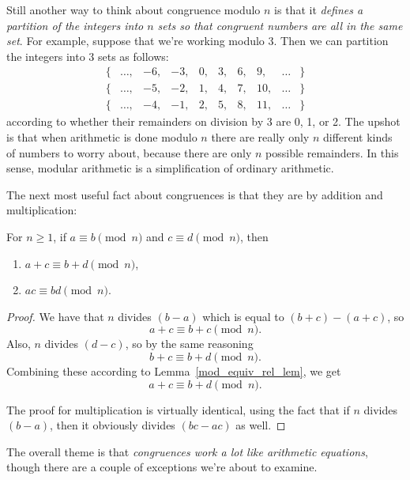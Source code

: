 Still another way to think about congruence modulo $n$ is that it \emph{defines a partition
  of the integers into $n$ sets so that congruent numbers are all in the same set}.  For
example, suppose that we're working modulo 3.  Then we can partition the integers into 3
sets as follows:
\[
\begin{array}{cccccccccc}
\{ & \dots, & -6, & -3, & 0, & 3, & 6, & 9, & \dots & \} \\ \{ & \dots, & -5, & -2, & 1, &
4, & 7, & 10, & \dots & \} \\ \{ & \dots, & -4, & -1, & 2, & 5, & 8, & 11, & \dots & \}
\end{array}
\]
according to whether their remainders on division by 3 are 0, 1, or 2.  The upshot is that
when arithmetic is done modulo $n$ there are really only $n$ different kinds of numbers to
worry about, because there are only $n$ possible remainders.  In this sense, modular
arithmetic is a simplification of ordinary arithmetic.\iffalse and thus is a good reasoning
tool.\fi


The next most useful fact about congruences is that they are  by addition
and multiplication:

\begin{lemma}\label{mod_congruence_lem} For $n \geq 1$, if
$a \equiv b \pmod{n}$ and $c \equiv d \pmod{n}$, then
\begin{enumerate}
\item $a + c \equiv b + d \pmod{n}$,\label{mod_congruence_lem+}
\item $a c \equiv b d \pmod{n}$.\label{mod_congruence_lem*}
\end{enumerate}
\end{lemma}

\begin{proof}
We have that $n$ divides $(b-a)$ which is equal to $(b+c)-(a+c)$, so
\[
a+c \equiv b+c \pmod{n}.
\]
Also, $n$ divides $(d-c)$, so by the same reasoning
\[
b + c \equiv b + d \pmod{n}.
\]
Combining these according to Lemma~\ref{mod_equiv_rel_lem}, we get
\[
a + c \equiv b + d \pmod{n}.
\]
 
The proof for multiplication is virtually identical, using the fact that if $n$ divides
$(b-a)$, then it obviously divides $(bc-ac)$ as well.
\end{proof}

The overall theme is that \emph{congruences work a lot like arithmetic equations}, though
there are a couple of exceptions we're about to examine.


